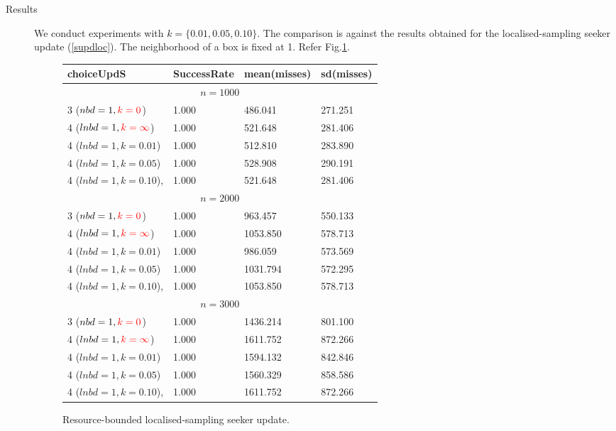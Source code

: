 \documentclass[11pt,a4paper]{article}
\begin{document}
\begin{description}
	\item[Results] We conduct experiments with $k = \{0.01, 0.05,0.10\}$. The comparison is against the results obtained for the localised-sampling seeker update (\ref{supdloc}). The neighborhood of a box is fixed at 1. Refer Fig.\ref{fig:resboundedls}.
	\begin{figure}[!h]
		\centering
		\begin{tabular}{llll}
			\hline \hline 
			choiceUpdS & SuccessRate & mean(misses) & sd(misses) \\
			\hline \hline 
			\multicolumn{4}{c}{$n = 1000$} \\ 
			\hline 
			3 ($nbd=1, \textcolor{red}{k = 0}$) & 1.000 & 486.041 & 271.251 \\
			4 ($lnbd=1, \textcolor{red}{k = \infty}$) & 1.000 & 521.648 & 281.406 \\
			4 ($lnbd=1, k = 0.01$) & 1.000 & 512.810 & 283.890 \\
			4 ($lnbd=1, k = 0.05$) & 1.000 & 528.908 & 290.191 \\
			4 ($lnbd=1, k = 0.10$), & 1.000 & 521.648 & 281.406 \\
			\hline 
			\hline 
			\multicolumn{4}{c}{$n = 2000$} \\ 
			\hline 
			3 ($nbd=1, \textcolor{red}{k = 0}$) & 1.000 & 963.457 & 550.133 \\
			4 ($lnbd=1, \textcolor{red}{k = \infty}$) & 1.000 & 1053.850 & 578.713 \\
			4 ($lnbd=1, k = 0.01$) & 1.000 & 986.059 & 573.569 \\
			4 ($lnbd=1, k = 0.05$) & 1.000 & 1031.794 & 572.295 \\
			4 ($lnbd=1, k = 0.10$), &  1.000 & 1053.850 & 578.713 \\
			\hline 
			\hline 
			\multicolumn{4}{c}{$n = 3000$} \\ 
			\hline 
			3 ($nbd=1, \textcolor{red}{k = 0}$) & 1.000 & 1436.214 & 801.100 \\
			4 ($lnbd=1, \textcolor{red}{k = \infty}$) & 1.000 & 1611.752 & 872.266 \\
			4 ($lnbd=1, k = 0.01$) & 1.000 & 1594.132 & 842.846 \\
			4 ($lnbd=1, k = 0.05$) & 1.000 & 1560.329 & 858.586 \\
			4 ($lnbd=1, k = 0.10$), & 1.000 & 1611.752 & 872.266 \\
			\hline 
			\hline 
		\end{tabular}
		\caption{Resource-bounded localised-sampling seeker update.}
		\label{fig:resboundedls}
	\end{figure}


\end{description}
\end{document}
